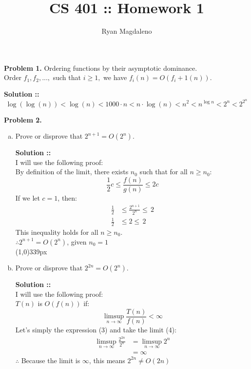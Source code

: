 \documentclass[11pt]{article}
\title{CS 401 :: Homework 1}
\author{Ryan Magdaleno}
\begin{document}
\maketitle


\textbf{Problem 1.} Ordering functions by their asymptotic dominance. \\
Order $f_1, f_2,...,$ such that $i\ge1,$ we have $f_i(n)=O(f_i+1(n)).$

\vspace{5px}\textbf{Solution ::}
$$ \log(\log(n)) < \log(n) < 1000\cdot n < n\cdot\log(n) < n^2 < n^{\log n} < 2^n 
< 2^{2^n}$$
\pagebreak


\textbf{Problem 2.} 
\begin{enumerate}[(a)]
\item 
Prove or disprove that $2^{n+1}=O(2^n)$.

\vspace{5px}\textbf{Solution ::} \\
I will use the following proof: \\
By definition of the limit, there exists $n_0$ such that for all $n \ge n_0$:
$$\frac{1}{2}c \le \frac{f(n)}{g(n)} \le 2c$$ 
If we let $c=1$, then:
\begin{align}
    \frac{1}{2} &\le \frac{2^{n+1}}{2^n} \le \,2 \\
    \frac{1}{2} &\le 2 \le \,2
\end{align}
This inequality holds for all $n \ge n_0$. \\
$\therefore 2^{n + 1} = O(2^n)$, given $n_0 = 1$ \\
\line(1,0){339px}
\item 
Prove or disprove that $2^{2n}=O(2^n)$.

\vspace{5px}\textbf{Solution ::} \\
I will use the following proof: \\
$T(n)$ is $O(f(n))$ if:
$$\limsup_{n\rightarrow\infty}\frac{T(n)}{f(n)}<\infty$$
Let's simply the expression (3) and take the limit (4):
\begin{align}
    \limsup_{n\rightarrow\infty} \frac{2^{2n}}{2^n} &= \limsup_{n\rightarrow\infty}
    2^n \\
    &= \infty
\end{align}
$\therefore$ Because the limit is $\infty$, this means $2^{2n} \neq O(2n)$
\end{enumerate}
\pagebreak
\end{document}
